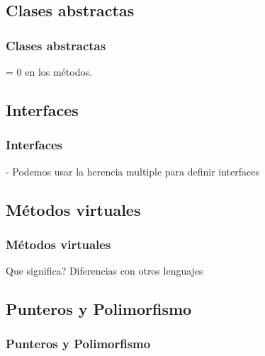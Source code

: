 \documentclass{beamer}
\begin{document}
\subsection{Clases abstractas}
\begin{frame}
\frametitle{Clases abstractas}

 = 0 en los métodos.
\end{frame}

\subsection{Interfaces}
\begin{frame}
\frametitle{Interfaces}
  - Podemos usar la herencia multiple para definir interfaces
\end{frame}

\subsection{Métodos virtuales}
\begin{frame}
\frametitle{Métodos virtuales}
Que significa? 
Diferencias con otros lenguajes
\end{frame}

\subsection{Punteros y Polimorfismo}
\begin{frame}
\frametitle{Punteros y Polimorfismo}
\end{frame}
\end{document}
